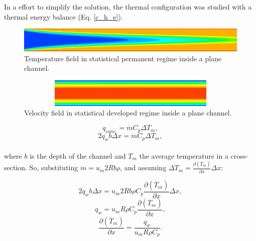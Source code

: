 \documentclass[10pt]{article} %
\begin{document}
In a effort to simplify the solution, the thermal configuration was studied with a thermal energy balance (Eq. \ref{c_h_e}).
\begin{figure}[h!]
	\centering
	\includegraphics[angle=0, scale=0.4]{fotos_formatacao_final/temperatura}
	\caption{Temperature field in statistical permanent regime inside a plane channel.}
	\label{figure.2}
\end{figure}
\begin{figure}[h!]
	\centering
	\includegraphics[angle=0, height=1.35cm , width=12.3cm]{fotos_formatacao_final/velocidade}
	\caption{Velocity field in statistical developed regime inside a plane channel.}
	\label{figure.3}
\end{figure}


\begin{equation}\label{c_h_e}
q_{conv.} = \dot{m} C_p \Delta T_m,
\end{equation}
\begin{equation}
2q_w b \Delta x = \dot{m} C_p \Delta T_m,
\end{equation}\\


{\parindent0pt where $b$ is the depth of the channel and $T_m$ the average temperature in a cross-section. So, substituting $ \dot{m} = u_m 2R b \rho $, and assuming $ \Delta T_m = \frac{\partial{\left(\overline{T}_m\right)}}{\partial{x}} \Delta x $:}

\begin{equation}
2q_w b \Delta x = u_m 2R b \rho  C_p \frac{\partial{\left(\overline{T}_m\right)}}{\partial{x}} \Delta x,
\end{equation}     
\begin{equation}
q_w = u_m R \rho  C_p \frac{\partial{\left(\overline{T}_m\right)}}{\partial{x}} ,
\end{equation} 
\begin{equation}\label{c_h_ee}
\frac{\partial{\left(\overline{T}_m\right)}}{\partial{x}} = \frac{q_w}{u_m  R \rho  C_p } .
\end{equation} 
\end{document}
